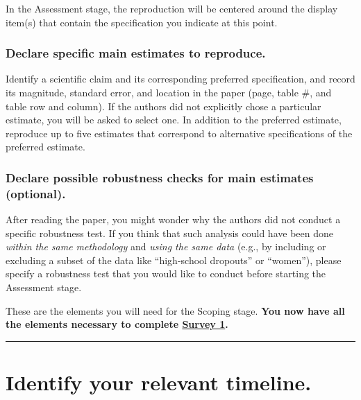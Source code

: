 \documentclass[]{book}
\begin{document}
In the Assessment stage, the reproduction will be centered around the display item(s) that contain the specification you indicate at this point.

\hypertarget{declare-specific-main-estimates-to-reproduce.}{%
\subsubsection*{Declare specific main estimates to reproduce.}\label{declare-specific-main-estimates-to-reproduce.}}

Identify a scientific claim and its corresponding preferred specification, and record its magnitude, standard error, and location in the paper (page, table \#, and table row and column). If the authors did not explicitly chose a particular estimate, you will be asked to select one. In addition to the preferred estimate, reproduce up to five estimates that correspond to alternative specifications of the preferred estimate.

\hypertarget{declare-possible-robustness-checks-for-main-estimates-optional.}{%
\subsubsection*{Declare possible robustness checks for main estimates (optional).}\label{declare-possible-robustness-checks-for-main-estimates-optional.}}

After reading the paper, you might wonder why the authors did not conduct a specific robustness test. If you think that such analysis could have been done \emph{within the same methodology} and \emph{using the same data} (e.g., by including or excluding a subset of the data like ``high-school dropouts'' or ``women''), please specify a robustness test that you would like to conduct before starting the Assessment stage.

These are the elements you will need for the Scoping stage. \textbf{You now have all the elements necessary to complete \href{https://berkeley.qualtrics.com/jfe/form/SV_2bO83uJvU9ZiTXv}{Survey 1}.}

\begin{center}\rule{0.5\linewidth}{0.5pt}\end{center}

\hypertarget{identify-your-relevant-timeline.}{%
\section{Identify your relevant timeline.}\label{identify-your-relevant-timeline.}}
\end{document}
